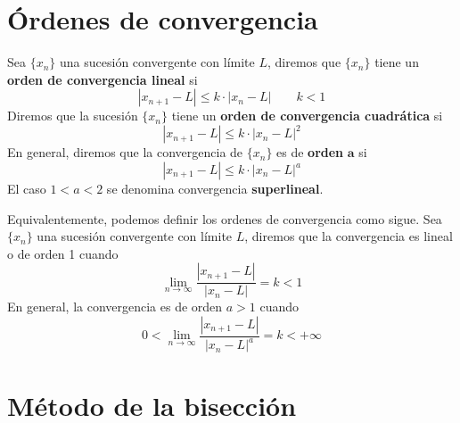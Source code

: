     \section{{\'O}rdenes de convergencia} 
    \begin{defin}
        Sea $\{x_n\}$ una sucesión convergente con límite $L$, diremos que $\{x_n\}$  tiene un \textbf{orden de convergencia lineal} si 
        $$|x_{n+1}-L|\leq k \cdot |x_n-L| \qquad k <1$$
        Diremos que la sucesión $\{x_n\}$ tiene un \textbf{orden de convergencia cuadrática} si 
        $$|x_{n+1}-L|\leq k \cdot |x_n-L|^2 $$
        En general, diremos que la convergencia de $\{x_n\}$ es de \textbf{orden }$\mathbf{a}$ si
        $$|x_{n+1}-L|\leq k \cdot |x_n-L|^a $$
        El caso $1<a<2$ se denomina convergencia \textbf{superlineal}.
    \end{defin}

    \begin{obs}
    Equivalentemente, podemos definir los ordenes de convergencia como sigue.  Sea $\{x_n\}$ una sucesión convergente con límite $L$, diremos que la convergencia es lineal o de orden 1 cuando
        $$\lim_{n \to \infty} \dfrac{|x_{n+1}-L|}{|x_n-L|}=k < 1$$
        En general, la convergencia es de orden $a>1$ cuando 
        $$0 < \lim_{n \to \infty} \dfrac{|x_{n+1}-L|}{|x_n-L|^a}=k < +\infty$$

    \end{obs}
    
\section{M{\'e}todo de la bisecci{\'o}n}
        
